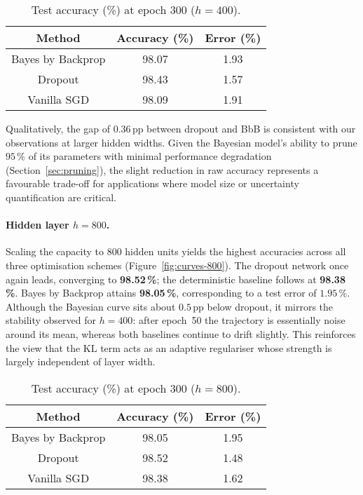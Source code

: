 \documentclass{article}
\begin{document}
\begin{table}[h]
\centering
\caption{Test accuracy (\%) at epoch 300 ($h=400$).}
\label{tab:acc-400}
\begin{tabular}{ccc}
\toprule
Method & Accuracy (\%) & Error (\%) \\
\midrule
Bayes by Backprop & 98.07 & 1.93 \\
Dropout           & 98.43 & 1.57 \\
Vanilla SGD       & 98.09 & 1.91 \\
\bottomrule
\end{tabular}
\end{table}

Qualitatively, the gap of $0.36$\,pp between dropout and BbB is consistent with our observations at larger hidden widths.  
Given the Bayesian model’s ability to prune $95\,\%$ of its parameters with minimal performance degradation (Section~\ref{sec:pruning}), the slight reduction in raw accuracy represents a favourable trade-off for applications where model size or uncertainty quantification are critical.

\paragraph{Hidden layer $h=800$.}
Scaling the capacity to $800$ hidden units yields the highest accuracies across all three optimisation schemes (Figure~\ref{fig:curves-800}).  
The dropout network once again leads, converging to \textbf{98.52\,\%}; the deterministic baseline follows at \textbf{98.38\,\%}.  
Bayes by Backprop attains \textbf{98.05\,\%}, corresponding to a test error of $1.95\,\%$.  
Although the Bayesian curve sits about $0.5$\,pp below dropout, it mirrors the stability observed for $h=400$: after epoch~50 the trajectory is essentially noise around its mean, whereas both baselines continue to drift slightly.  This reinforces the view that the KL term acts as an adaptive regulariser whose strength is largely independent of layer width.

\begin{table}[h]
\centering
\caption{Test accuracy (\%) at epoch 300 ($h=800$).}
\label{tab:acc-800}
\begin{tabular}{ccc}
\toprule
Method & Accuracy (\%) & Error (\%) \\
\midrule
Bayes by Backprop & 98.05 & 1.95 \\
Dropout           & 98.52 & 1.48 \\
Vanilla SGD       & 98.38 & 1.62 \\
\bottomrule
\end{tabular}
\end{table}
\end{document}
